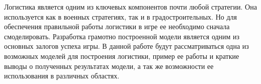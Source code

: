 
Логистика является одним из ключевых компонентов почти любой стратегии. 
Она используется как в военных стратегиях, так и в градостроительных. 
Но для обеспечения правильной работы логистики в игре ее необходимо 
сначала смоделировать. Разработка грамотно построенной модели является 
одним из основных залогов успеха игры. В данной работе будут рассматриваться 
одна из возможных моделей для построения логистики, пример ее работы и краткие
выводы о полученных результатах модели, а так же возможности ее использования
в различных областях.

\clearpage